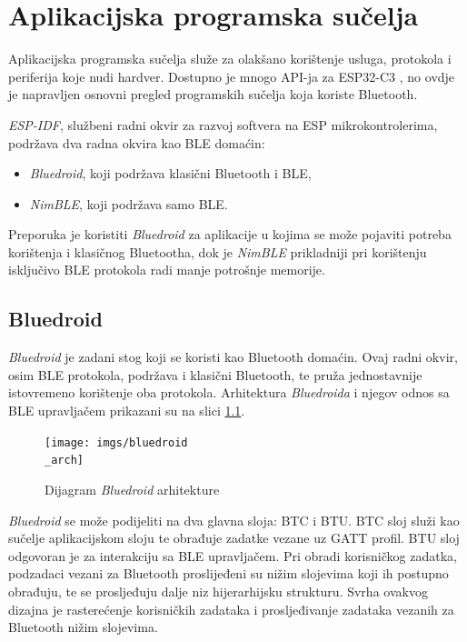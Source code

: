 \chapter{Aplikacijska programska sučelja}

Aplikacijska programska sučelja služe za olakšano korištenje usluga, protokola i periferija koje nudi hardver. Dostupno je mnogo API-ja za ESP32-C3 \cite{espressif}, no ovdje je napravljen osnovni pregled programskih sučelja koja koriste Bluetooth. 

\textit{ESP-IDF}, službeni radni okvir za razvoj softvera na ESP mikrokontrolerima, podržava dva radna okvira kao BLE domaćin:
\begin{itemize}
	\item \textit{Bluedroid}, koji podržava klasični Bluetooth i BLE,
	\item \textit{NimBLE}, koji podržava samo BLE.
\end{itemize}

Preporuka je koristiti \textit{Bluedroid} za aplikacije u kojima se može pojaviti potreba korištenja i klasičnog Bluetootha, dok je \textit{NimBLE} prikladniji pri korištenju isključivo BLE protokola radi manje potrošnje memorije. \cite{esp_bt_api}

\section{Bluedroid}

\textit{Bluedroid} je zadani stog koji se koristi kao Bluetooth domaćin. Ovaj radni okvir, osim BLE protokola, podržava i klasični Bluetooth, te pruža jednostavnije istovremeno korištenje oba protokola. Arhitektura \textit{Bluedroida} i njegov odnos sa BLE upravljačem prikazani su na slici \ref{fig:bluedroid_arch}.

\begin{figure}[ht]
	\centering
	\texttt{[image: imgs/bluedroid\\\_arch]}
	\caption{Dijagram \textit{Bluedroid} arhitekture}
	\label{fig:bluedroid_arch}
\end{figure}

\textit{Bluedroid} se može podijeliti na dva glavna sloja: BTC i BTU. BTC sloj služi kao sučelje aplikacijskom sloju te obrađuje zadatke vezane uz GATT profil. BTU sloj odgovoran je za interakciju sa BLE upravljačem. Pri obradi korisničkog zadatka, podzadaci vezani za Bluetooth proslijeđeni su nižim slojevima koji ih postupno obrađuju, te se prosljeđuju dalje niz hijerarhijsku strukturu. Svrha ovakvog dizajna je rasterećenje korisničkih zadataka i prosljeđivanje zadataka vezanih za Bluetooth nižim slojevima. \cite{esp32_bt}

